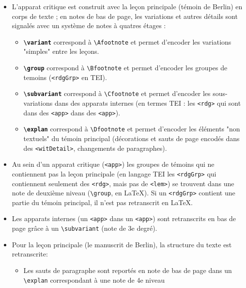 \documentclass[12pt, a4paper]{article}
\begin{document}
	\begin{itemize}
		\item{L'apparat critique est construit avec la leçon principale (témoin de 
			Berlin) en corps de texte ; en notes de bas de page, les variations et 
			autres détails sont signalés avec un système de notes à quatres étages :}
		\begin{itemize}
			\item{\textbf{\texttt{\textbackslash variant}} correspond à \texttt{\textbackslash Afootnote} et 
				permet d'encoder les variations "simples" entre les leçons.}
			\item{\textbf{\texttt{\textbackslash group}} correspond à \texttt{\textbackslash Bfootnote} et 
				permet d'encoder les groupes de temoins (\texttt{<rdgGrp>} 
				en TEI).}
			\item{\textbf{\texttt{\textbackslash subvariant}} correspond à \texttt{\textbackslash Cfootnote} 
				et permet d'encoder les sous-variations dans des apparats internes 
				(en termes TEI : les \texttt{<rdg>} qui sont dans des 
				\texttt{<app>} dans des \texttt{<app>}).}
			\item{\textbf{\texttt{\textbackslash explan}} correspond à \texttt{\textbackslash Dfootnote} et 
				permet d'encoder les éléments "non textuels" du témoin principal 
				(décorations et sauts de page encodés dans des \texttt{<witDetail>},
				changements de paragraphes).}
		\end{itemize}
		\item{Au sein d'un apparat critique (\texttt{<app>}) les groupes de 
			témoins qui ne contiennent pas la leçon principale (en langage TEI 
			les \texttt{<rdgGrp>} qui contiennent seulement des 
			\texttt{<rdg>}, mais pas de \texttt{<lem>}) se trouvent 
			dans une note de deuxième niveau (\texttt{\textbackslash group}, en \LaTeX). Si un 
			\texttt{<rdgGrp>} contient une partie du témoin principal, il n'est 
			pas retranscrit en \LaTeX.}
		\item{Les apparats internes (un \texttt{<app>} dans un 
			\texttt{<app>}) sont retranscrits en bas de page grâce à un 
			\texttt{\textbackslash subvariant} (note de 3e degré).}
		\item{Pour la leçon principale (le manuscrit de Berlin), la structure du 
			texte est retranscrite:}
		\begin{itemize}
			\item{Les sauts de paragraphe sont reportés en note de 
				bas de page dans un \texttt{\textbackslash explan} correspondant à une note de 4e niveau 
}
\end{itemize}
\end{itemize}
\end{document}
